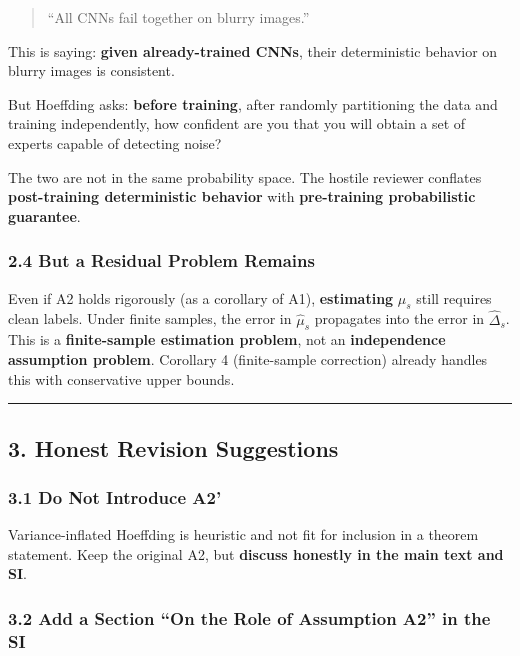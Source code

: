 \documentclass[
  12pt,
]{ctexart}
\begin{document}
\begin{quote}
``All CNNs fail together on blurry images.''
\end{quote}

This is saying: \textbf{given already-trained CNNs}, their deterministic behavior on blurry images is consistent.

But Hoeffding asks: \textbf{before training}, after randomly partitioning the data and training independently, how confident are you that you will obtain a set of experts capable of detecting noise?

The two are not in the same probability space. The hostile reviewer conflates \textbf{post-training deterministic behavior} with \textbf{pre-training probabilistic guarantee}.

\subsubsection{2.4 But a Residual Problem Remains}\label{residual-problem}

Even if A2 holds rigorously (as a corollary of A1), \textbf{estimating} \(\mu_s\) still requires clean labels. Under finite samples, the error in \(\hat{\mu}_s\) propagates into the error in \(\hat{\Delta}_s\). This is a \textbf{finite-sample estimation problem}, not an \textbf{independence assumption problem}. Corollary 4 (finite-sample correction) already handles this with conservative upper bounds.

\begin{center}\rule{0.5\linewidth}{0.5pt}\end{center}

\subsection{3. Honest Revision Suggestions}\label{honest-revision-suggestions}

\subsubsection{3.1 Do Not Introduce A2'}\label{do-not-introduce-a2-prime}

Variance-inflated Hoeffding is heuristic and not fit for inclusion in a theorem statement. Keep the original A2, but \textbf{discuss honestly in the main text and SI}.

\subsubsection{3.2 Add a Section ``On the Role of Assumption A2'' in the SI}\label{add-a-section-on-the-role-of-assumption-a2}
\end{document}
